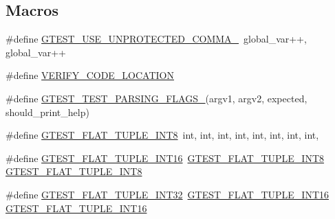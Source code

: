 \subsection*{Macros}
\begin{DoxyCompactItemize}
\item 
\#define \mbox{\hyperlink{googletest-master_2googletest_2test_2gtest__unittest_8cc_ad42d1faf4b99498972bc2e03f236521a}{G\+T\+E\+S\+T\+\_\+\+U\+S\+E\+\_\+\+U\+N\+P\+R\+O\+T\+E\+C\+T\+E\+D\+\_\+\+C\+O\+M\+M\+A\+\_\+}}~global\+\_\+var++, global\+\_\+var++
\item 
\#define \mbox{\hyperlink{googletest-master_2googletest_2test_2gtest__unittest_8cc_a7720eac5c0fc782a0447f4479923c7bd}{V\+E\+R\+I\+F\+Y\+\_\+\+C\+O\+D\+E\+\_\+\+L\+O\+C\+A\+T\+I\+ON}}
\item 
\#define \mbox{\hyperlink{googletest-master_2googletest_2test_2gtest__unittest_8cc_a0c91cd98ee7f96c5c1247f852e46d700}{G\+T\+E\+S\+T\+\_\+\+T\+E\+S\+T\+\_\+\+P\+A\+R\+S\+I\+N\+G\+\_\+\+F\+L\+A\+G\+S\+\_\+}}(argv1,  argv2,  expected,  should\+\_\+print\+\_\+help)
\item 
\#define \mbox{\hyperlink{googletest-master_2googletest_2test_2gtest__unittest_8cc_af466a50c3676a701b0b9c5db2263f6e7}{G\+T\+E\+S\+T\+\_\+\+F\+L\+A\+T\+\_\+\+T\+U\+P\+L\+E\+\_\+\+I\+N\+T8}}~int, int, int, int, int, int, int, int,
\item 
\#define \mbox{\hyperlink{googletest-master_2googletest_2test_2gtest__unittest_8cc_aae118824bf510fcc9ecc8811db23d2f2}{G\+T\+E\+S\+T\+\_\+\+F\+L\+A\+T\+\_\+\+T\+U\+P\+L\+E\+\_\+\+I\+N\+T16}}~\mbox{\hyperlink{_obj__test_2lib_2googletest-master_2googletest_2test_2gtest__unittest_8cc_af466a50c3676a701b0b9c5db2263f6e7}{G\+T\+E\+S\+T\+\_\+\+F\+L\+A\+T\+\_\+\+T\+U\+P\+L\+E\+\_\+\+I\+N\+T8}} \mbox{\hyperlink{_obj__test_2lib_2googletest-master_2googletest_2test_2gtest__unittest_8cc_af466a50c3676a701b0b9c5db2263f6e7}{G\+T\+E\+S\+T\+\_\+\+F\+L\+A\+T\+\_\+\+T\+U\+P\+L\+E\+\_\+\+I\+N\+T8}}
\item 
\#define \mbox{\hyperlink{googletest-master_2googletest_2test_2gtest__unittest_8cc_a1c7baa94acbbb0d0ef250772fdad3972}{G\+T\+E\+S\+T\+\_\+\+F\+L\+A\+T\+\_\+\+T\+U\+P\+L\+E\+\_\+\+I\+N\+T32}}~\mbox{\hyperlink{_obj__test_2lib_2googletest-master_2googletest_2test_2gtest__unittest_8cc_aae118824bf510fcc9ecc8811db23d2f2}{G\+T\+E\+S\+T\+\_\+\+F\+L\+A\+T\+\_\+\+T\+U\+P\+L\+E\+\_\+\+I\+N\+T16}} \mbox{\hyperlink{_obj__test_2lib_2googletest-master_2googletest_2test_2gtest__unittest_8cc_aae118824bf510fcc9ecc8811db23d2f2}{G\+T\+E\+S\+T\+\_\+\+F\+L\+A\+T\+\_\+\+T\+U\+P\+L\+E\+\_\+\+I\+N\+T16}}

\end{DoxyCompactItemize}
